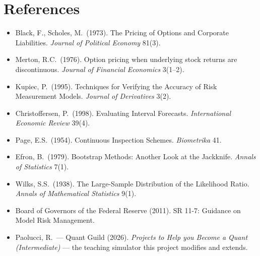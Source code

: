\documentclass[11pt,a4paper]{article}
\begin{document}
\section*{References}
\begin{itemize}[itemsep=1pt,label={}]
\item Black, F., Scholes, M.\ (1973). The Pricing of Options and Corporate
  Liabilities. \emph{Journal of Political Economy} 81(3).
\item Merton, R.C.\ (1976). Option pricing when underlying stock returns are
  discontinuous. \emph{Journal of Financial Economics} 3(1--2).
\item Kupiec, P.\ (1995). Techniques for Verifying the Accuracy of Risk
  Measurement Models. \emph{Journal of Derivatives} 3(2).
\item Christoffersen, P.\ (1998). Evaluating Interval Forecasts.
  \emph{International Economic Review} 39(4).
\item Page, E.S.\ (1954). Continuous Inspection Schemes. \emph{Biometrika} 41.
\item Efron, B.\ (1979). Bootstrap Methods: Another Look at the Jackknife.
  \emph{Annals of Statistics} 7(1).
\item Wilks, S.S.\ (1938). The Large-Sample Distribution of the Likelihood
  Ratio. \emph{Annals of Mathematical Statistics} 9(1).
\item Board of Governors of the Federal Reserve (2011). SR 11-7: Guidance on
  Model Risk Management.
\item Paolucci, R.\ --- Quant Guild (2026). \emph{Projects to Help you Become a
  Quant (Intermediate)} --- the teaching simulator this project modifies and
  extends.
\end{itemize}
\end{document}

